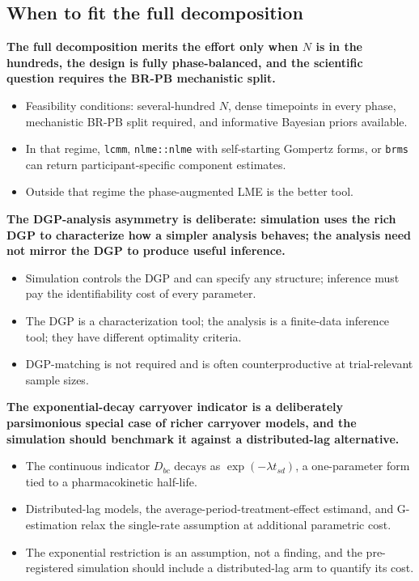 \documentclass[
  11pt,
]{article}
\begin{document}
\subsection{When to fit the full decomposition}\label{when-to-fit-the-full-decomposition}

\textbf{The full decomposition merits the effort only when $N$ is in the hundreds, the design is fully phase-balanced, and the scientific question requires the BR-PB mechanistic split.}

\begin{itemize}\setlength{\itemsep}{2pt}\setlength{\parskip}{0pt}
\item Feasibility conditions: several-hundred $N$, dense timepoints in every phase, mechanistic BR-PB split required, and informative Bayesian priors available.
\item In that regime, \texttt{lcmm}, \texttt{nlme::nlme} with self-starting Gompertz forms, or \texttt{brms} can return participant-specific component estimates.
\item Outside that regime the phase-augmented LME is the better tool.
\end{itemize}

\textbf{The DGP-analysis asymmetry is deliberate: simulation uses the rich DGP to characterize how a simpler analysis behaves; the analysis need not mirror the DGP to produce useful inference.}

\begin{itemize}\setlength{\itemsep}{2pt}\setlength{\parskip}{0pt}
\item Simulation controls the DGP and can specify any structure; inference must pay the identifiability cost of every parameter.
\item The DGP is a characterization tool; the analysis is a finite-data inference tool; they have different optimality criteria.
\item DGP-matching is not required and is often counterproductive at trial-relevant sample sizes.
\end{itemize}

\textbf{The exponential-decay carryover indicator is a deliberately parsimonious special case of richer carryover models, and the simulation should benchmark it against a distributed-lag alternative.}

\begin{itemize}\setlength{\itemsep}{2pt}\setlength{\parskip}{0pt}
\item The continuous indicator $D_{bc}$ decays as $\exp(-\lambda t_{sd})$, a one-parameter form tied to a pharmacokinetic half-life.
\item Distributed-lag models, the average-period-treatment-effect estimand, and G-estimation relax the single-rate assumption at additional parametric cost.
\item The exponential restriction is an assumption, not a finding, and the pre-registered simulation should include a distributed-lag arm to quantify its cost.
\end{itemize}
\end{document}
